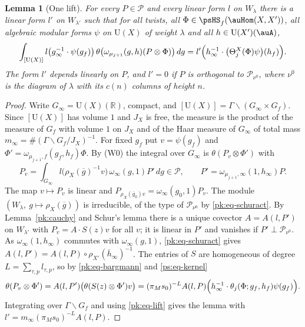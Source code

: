 \documentclass[10pt]{amsart}
\newtheorem{lemma}[theorem]{Lemma}
\theoremstyle{definition}
\theoremstyle{remark}
\newcommand{\R}{\mathbb R}
\providecommand{\auU}{\mathrm U}
\providecommand{\aubar}[1]{\overline{#1}}
\begin{document}
\begin{lemma}[One lift]\label{pk:single}
For every $P\in\mathcal P$ and every linear form $l$ on $W_\lambda$ there is a linear form $l'$ on
$W_{\lambda'}$ such that for all twists, all $\Phi\in\psHS_f(\auHom(X,X'))$, all algebraic modular
forms $\psi$ on $\auU(X)$ of weight $\lambda$ and all $h\in\auU(X')(\auA)$,
\[
\int_{[\auU(X)]}l\bigl(g_\infty^{-1}\cdot\psi(g_f)\bigr)\,\theta\bigl(\omega_{\mu_{j+1}}(g,h)(P\otimes
\Phi)\bigr)\,dg=l'\Bigl(h_\infty^{-1}\cdot\bigl(\Theta^X_j(\Phi)\psi\bigr)(h_f)\Bigr).
\]
The form $l'$ depends linearly on $P$, and $l'=0$ if $P$ is orthogonal to $\mathcal P_{\nu^0}$,
where $\nu^0$ is the diagram of $\lambda$ with its $c(n)$ columns of height $n$.
\end{lemma}
\begin{proof}
Write $G_\infty=\auU(X)(\R)$, compact, and $[\auU(X)]=\Gamma\backslash(G_\infty\times G_f)$. Since
$[\auU(X)]$ has volume $1$ and $J_X$ is free, the measure is the product of the measure of $G_f$
with volume $1$ on $J_X$ and of the Haar measure of $G_\infty$ of total mass
$m_\infty=\#(\Gamma\backslash G_f/J_X)^{-1}$. For fixed $g_f$ put $v=\psi(g_f)$ and
$\Phi'=\omega_{\mu_{j+1},f}(g_f,h_f)\Phi$. By (W0) the integral over $G_\infty$ is
$\theta(P_v\otimes\Phi')$ with
\[
P_v=\int_{G_\infty}l\bigl(\rho_X(\aubar g)^{-1}v\bigr)\,\omega_\infty(g,1)P'\,dg\in\mathcal P,\qquad
P'=\omega_{\mu_{j+1},\infty}(1,h_\infty)P .
\]
The map $v\mapsto P_v$ is linear and $P_{\rho_X(\aubar g_0)v}=\omega_\infty(g_0,1)P_v$. The module
$(W_\lambda,\ g\mapsto\rho_X(\aubar g))$ is irreducible, of the type of $\mathcal P_{\nu^0}$ by
\eqref{pk:eq-schuract}. By Lemma~\ref{pk:cauchy} and Schur's lemma there is a unique covector
$A=A(l,P')$ on $W_{\lambda'}$ with $P_v=A\cdot S(z)v$ for all $v$; it is linear in $P'$ and
vanishes if $P'\perp\mathcal P_{\nu^0}$. As $\omega_\infty(1,h_\infty)$ commutes with
$\omega_\infty(g,1)$, \eqref{pk:eq-schuract} gives $A(l,P')=A(l,P)\circ\rho_{X'}(\aubar h_\infty)^{-1}$.
The entries of $S$ are homogeneous of degree $L=\sum_{\tau,p}l_{\tau,p}$, so by
\eqref{pk:eq-bargmann} and \eqref{ps:eq-kernel}
\[
\theta(P_v\otimes\Phi')=A(l,P')\bigl(\theta(S(z)\otimes\Phi')v\bigr)=(\pi_Ms_0)^{-L}A(l,P)\Bigl(
h_\infty^{-1}\cdot\theta_j(\Phi;g_f,h_f)\psi(g_f)\Bigr).
\]
Integrating over $\Gamma\backslash G_f$ and using \eqref{pk:eq-lift} gives the lemma with
$l'=m_\infty(\pi_Ms_0)^{-L}A(l,P)$.
\end{proof}
\end{document}
